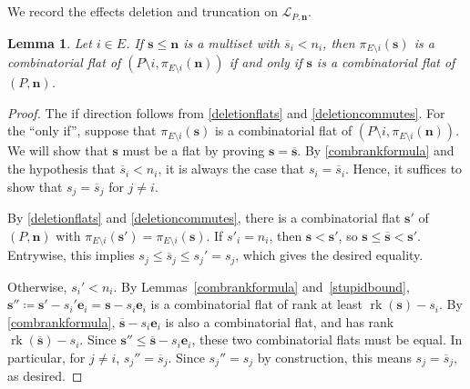 \documentclass[11pt]{article}
\newtheorem{lemm}[theo]{Lemma}
\theoremstyle{definition}
\numberwithin{equation}{section}
\DeclareMathOperator{\rk}{rk}
\newcommand{\revision}[1]{{#1}}
\begin{document}
\subsection{}\label{comboflatsdeletiontruncation}
We record the effects deletion and truncation on $\mathcal L_{P, \mathbf n}$.
\begin{lemm}\label{localproduct}
  Let $i \in E$. If $\mathbf s \leq \mathbf n$ is a multiset with $\overline s_i < n_i$, then $\pi_{E \setminus i}(\mathbf s)$ is a combinatorial flat of $(P \setminus i, \pi_{E \setminus i}(\mathbf n))$ if and only if $\mathbf s$ is a combinatorial flat of $(P, \mathbf n)$.
\end{lemm}
\begin{proof}
  \revision{The if direction follows from \cref{deletionflats} and \cref{deletioncommutes}}.
  For the ``only if'', suppose that $\pi_{E \setminus i}(\mathbf s)$ is a combinatorial flat of $(P \setminus i, \pi_{E \setminus i}(\mathbf n))$. We will show that $\mathbf s$ must be a flat by proving $\mathbf s = \overline{\mathbf s}$.
  By \cref{combrankformula} and the hypothesis that $\overline s_i < n_i$, it is always the case that $s_i = \overline s_i$.
  Hence, it suffices to show that $s_j = \overline s_j$ for $j \neq i$.

  \revision{By \cref{deletionflats} and \cref{deletioncommutes}}, there is a combinatorial flat $\mathbf s'$ of $(P, \mathbf n)$ with $\pi_{E \setminus i}(\mathbf s') = \pi_{E \setminus i}(\mathbf s)$.
  If $s'_i = n_i$, then $\mathbf s < \mathbf s'$, so $\mathbf s \leq \overline{\mathbf s} < \mathbf s'$.
  Entrywise, this implies $s_j \leq \overline s_j \leq s_j' = s_j$, which gives the desired equality.
  
  Otherwise,  $s_i' < n_i$.
  By Lemmas~\ref{combrankformula} and~\ref{stupidbound}, $\mathbf s'' \coloneqq \mathbf s' - s_i' \mathbf e_i = \mathbf s - s_i \mathbf e_i$ is a combinatorial flat of rank at least $\rk(\mathbf s) - s_i$.
  By \cref{combrankformula}, $\overline{\mathbf s} - s_i \mathbf e_i$ is also a combinatorial flat, and has rank $\rk(\overline{\mathbf s}) - s_i$.
  Since $\mathbf s'' \leq \overline{\mathbf s} - s_i \mathbf e_i$, these two combinatorial flats must be equal.
  In particular, for $j \neq i$, $s_j'' = \overline s_j$. Since $s_j'' = s_j$ by construction, this means $s_j =\overline s_j$, as desired.
\end{proof}
\end{document}
